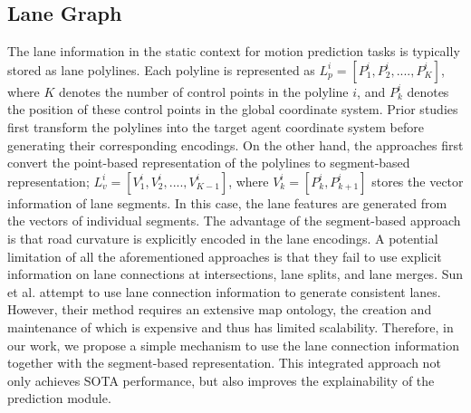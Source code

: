 \subsection{Lane Graph} \label{subsection:lane_graph}
The lane information in the static context for motion prediction tasks is typically stored as lane polylines. Each polyline is represented as $L_p^i = [P_1^i, P_2^i, ...., P_K^i]$, where $K$ denotes the number of control points in the polyline $i$, and $P_k^i$ denotes the position of these control points in the global coordinate system. Prior studies \cite{gao2020vectornet,ngiam2021scene,liu2024laformer} first transform the polylines into the target agent coordinate system before generating their corresponding encodings. On the other hand, the approaches \cite{liang2020learning,wang2022ltp,zhou2022hivt,zhou2023query} first convert the point-based representation of the polylines to segment-based representation; $L_v^i = [V_1^i, V_2^i, ...., V_{K-1}^i]$, where $V_{k}^i = [P_k^i, P_{k+1}^i]$ stores the vector information of lane segments. In this case, the lane features are generated from the vectors of individual segments. The advantage of the segment-based approach is that road curvature is explicitly encoded in the lane encodings. A potential limitation of all the aforementioned approaches is that they fail to use explicit information on lane connections at intersections, lane splits, and lane merges. 
Sun et al. \cite{sun2024semanticformer} attempt to use lane connection information to generate consistent lanes. However, their method requires an extensive map ontology, the creation and maintenance of which is expensive and thus has limited scalability. Therefore, in our work, we propose a simple mechanism to use the lane connection information together with the segment-based representation. This integrated approach not only achieves SOTA performance, but also improves the explainability of the prediction module.  

